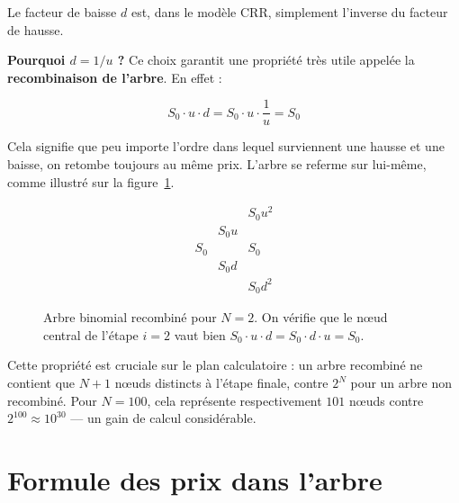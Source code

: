 \documentclass[11pt]{report}
\begin{document}
Le facteur de baisse $d$ est, dans le modèle CRR, simplement l'inverse du
facteur de hausse.

\medskip

\noindent{}

\medskip

\textbf{Pourquoi $d = 1/u$ ?} Ce choix garantit une propriété très utile
appelée la \textbf{recombinaison de l'arbre}. En effet :

\begin{equation}
    S_0 \cdot u \cdot d = S_0 \cdot u \cdot \frac{1}{u} = S_0
\end{equation}

Cela signifie que peu importe l'ordre dans lequel surviennent une hausse
et une baisse, on retombe toujours au même prix. L'arbre \og se referme \fg{}
sur lui-même, comme illustré sur la figure~\ref{fig:arbre_recombinaison}.

\begin{figure}[H]
\centering
\begin{equation*}
\begin{array}{ccccc}
            &           & S_0 u^2   \\
            & S_0 u     &           \\
S_0         &           & S_0       \\
            & S_0 d     &           \\
            &           & S_0 d^2
\end{array}
\end{equation*}
\caption{Arbre binomial recombiné pour $N = 2$. On vérifie que le nœud
central de l'étape $i = 2$ vaut bien $S_0 \cdot u \cdot d = S_0 \cdot d
\cdot u = S_0$.}
\label{fig:arbre_recombinaison}
\end{figure}

Cette propriété est cruciale sur le plan calculatoire : un arbre recombiné
ne contient que $N+1$ nœuds distincts à l'étape finale, contre $2^N$ pour
un arbre non recombiné. Pour $N = 100$, cela représente respectivement $101$
nœuds contre $2^{100} \approx 10^{30}$ — un gain de calcul considérable.

\section{Formule des prix dans l'arbre}
\end{document}
